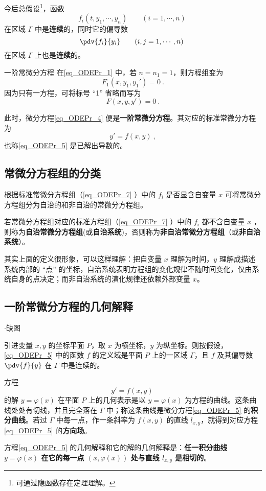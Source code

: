 今后总假设\footnote{可通过隐函数存在定理理解。}，函数 
\begin{equation}
f_i(t,y_1,\cdots,y_n)\qquad (i=1,\cdots,n)~
\end{equation}
在区域 $\Gamma$ 中是\textbf{连续}的，同时它的偏导数
\begin{equation}
\pdv{f_i}{y_i}\qquad (i,j=1,\cdots,n)~
\end{equation}
在区域 $\Gamma$ 上也是\textbf{连续}的。
\begin{example}{一阶常微分方程}
在\autoref{eq_ODEPr_1} 中，若 $n=n_1=1$，则方程组变为
\begin{equation}\label{eq_ODEPr_3}
F_1(x,y_1,y_1')=0~.
\end{equation}
因为只有一方程，可将标号 “1” 省略而写为
\begin{equation}\label{eq_ODEPr_4}
F(x,y,y')=0~.
\end{equation}

此时，微分方程\autoref{eq_ODEPr_4} 便是\textbf{一阶常微分方程}。其对应的标准常微分方程为
\begin{equation}\label{eq_ODEPr_5}
y'=f(x,y)~,
\end{equation}
也称\autoref{eq_ODEPr_5} 是已解出导数的。
\end{example}
\subsection{常微分方程组的分类}
根据标准常微分方程组（\autoref{eq_ODEPr_7} ）中的 $f_i$ 是否显含自变量 $x$ 可将常微分方程组分为自治的和非自治的常微分方程组。
\begin{definition}{}\label{def_ODEPr_2}
若常微分方程组对应的标准方程组（\autoref{eq_ODEPr_7} ）中的 $f_i$ 都不含自变量 $x$ ，则称为\textbf{自治常微分方程组}(或\textbf{自治系统})，否则称为\textbf{非自治常微分方程组}（或\textbf{非自治系统}）。
\end{definition}
其实上面的定义很形象，可以这样理解：把自变量 $x$ 理解为时间，$y$ 理解成描述系统内部的 “点” 的坐标，自治系统表明方程组的变化规律不随时间变化，仅由系统自身的点决定；而非自治系统的演化规律还依赖外部变量 $x$。
\subsection{一阶常微分方程的几何解释}
\begin{issues}
$\cdot$缺图
\end{issues}

引进变量 $x,y$ 的坐标平面 $P$，取 $x$ 为横坐标，$y$ 为纵坐标。则按假设，\autoref{eq_ODEPr_5} 中的函数 $f$ 的定义域是平面 $P$ 上的一区域 $\Gamma$，且 $f$ 及其偏导数 $\pdv{f}{y}$ 在 $\Gamma$ 中是连续的。

方程
\begin{equation}
y'=f(x,y)~
\end{equation}
的解 $y=\varphi(x)$ 在平面 $P$ 上的几何表示是以 $y=\varphi(x)$ 为方程的曲线。这条曲线处处有切线，并且完全落在 $\Gamma$ 中；称这条曲线是微分方程\autoref{eq_ODEPr_5} 的\textbf{积分曲线}。若过 $\Gamma$ 中每一点，作一条斜率为 $f(x,y)$ 的直线 $l_{x,y}$，就得到对应方程\autoref{eq_ODEPr_5} 的\textbf{方向场}。

方程\autoref{eq_ODEPr_5} 的几何解释和它的解的几何解释是：\textbf{任一积分曲线 $y=\varphi(x)$ 在它的每一点 $(x,\varphi(x))$ 处与直线 $l_{x,y}$ 是相切的}。
